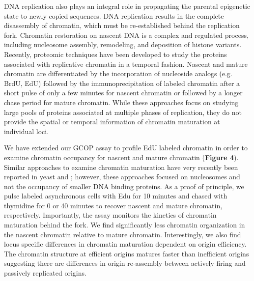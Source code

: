 

DNA replication also plays an integral role in propagating the parental epigenetic state to newly copied sequences.  DNA replication results in the complete disassembly of chromatin, which must be re-established behind the replication fork. Chromatin restoration on nascent DNA is a complex and regulated process, including nucleosome assembly, remodeling, and deposition of histone variants\citep{MacAlpine2013-ds}.  Recently, proteomic techniques have been developed to study the proteins associated with replicative chromatin in a temporal fashion\citep{Alabert2014-io,Sirbu2011-wx}. Nascent and mature chromatin are differentiated by the incorporation of nucleoside analogs (e.g. BrdU, EdU) followed by the immunoprecipitation of labeled chromatin after a short pulse of only a few minutes for nascent chromatin or followed by a longer chase period for mature chromatin. While these approaches focus on studying large pools of proteins associated at multiple phases of replication, they do not provide the spatial or temporal information of chromatin maturation at individual loci. 

We have extended our GCOP assay to profile EdU labeled chromatin in order to examine chromatin occupancy for nascent and mature chromatin ({\color{dukeblue}\textbf{Figure 4}}).  Similar approaches to examine chromatin maturation have very recently been reported in yeast\citep{Vasseur2016-rx} and \dros\citep{Ramachandran2016-zu}; however, these approaches focused on nucleosomes and not the occupancy of smaller DNA binding proteins.  As a proof of principle, we pulse labeled asynchronous cells with Edu for 10 minutes and chased with thymidine for 0 or 40 minutes to recover nascent and mature chromatin, respectively.  Importantly, the  assay monitors the kinetics of chromatin maturation behind the fork. We find significantly less chromatin organization in the nascent chromatin relative to mature chromatin. Interestingly, we also find locus specific differences in chromatin maturation dependent on origin efficiency.  The chromatin structure at efficient origins matures faster than inefficient origins suggesting there are differences in origin re-assembly between actively firing and passively replicated origins.

